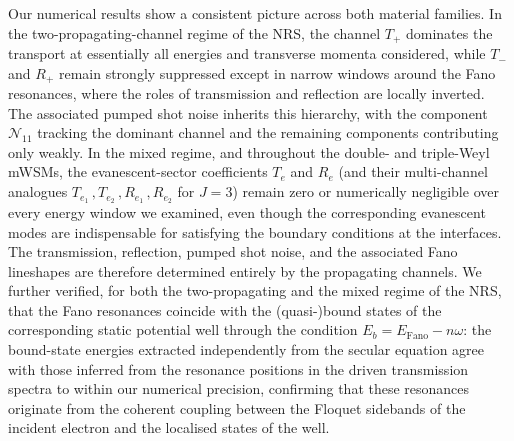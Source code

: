 \documentclass[aps,prb,onecolumn,longbibliography,nofootinbib,citeautoscript,10pt]{revtex4-2}
\begin{document}
Our numerical results show a consistent picture across both material families. In the two-propagating-channel regime of the NRS, the channel $T_+$ dominates the transport at essentially all energies and transverse momenta considered, while $T_-$ and $R_+$ remain strongly suppressed except in narrow windows around the Fano resonances, where the roles of transmission and reflection are locally inverted. The associated pumped shot noise inherits this hierarchy, with the component $\mathcal{N}_{11}$ tracking the dominant channel and the remaining components contributing only weakly. In the mixed regime, and throughout the double- and triple-Weyl mWSMs, the evanescent-sector coefficients $T_e$ and $R_e$ (and their multi-channel analogues $T_{e_1} \,,  T_{e_2} \,,  R_{e_1} \,,  R_{e_2}$ for $J=3$) remain zero or numerically negligible over every energy window we examined, even though the corresponding evanescent modes are indispensable for satisfying the boundary conditions at the interfaces. The transmission, reflection, pumped shot noise, and the associated Fano lineshapes are therefore determined entirely by the propagating channels. We further verified, for both the two-propagating and the mixed regime of the NRS, that the Fano resonances coincide with the (quasi-)bound states of the corresponding static potential well through the condition $E_b = E_{\text{Fano}} - n\omega$: the bound-state energies extracted independently from the secular equation agree with those inferred from the resonance positions in the driven transmission spectra to within our numerical precision, confirming that these resonances originate from the coherent coupling between the Floquet sidebands of the incident electron and the localised states of the well.
\end{document}
